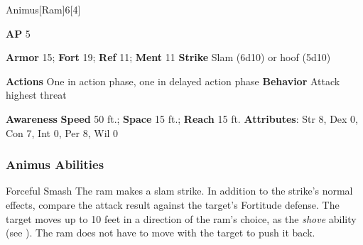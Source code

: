 \begin{monsection}{Animus}[Ram]{6}[4]
\vspace{-1em}\vspace{-1em}
\begin{spellcontent}
\begin{spelltargetinginfo}
{\textbf{AP} 5}

\pari \textbf{Armor} 15;
\textbf{Fort} 19;
\textbf{Ref} 11;
\textbf{Ment} 11
\pari \textbf{Strike} Slam  (6d10) or hoof  (5d10)


\pari \textbf{Actions} One in action phase, one in delayed action phase
\pari \textbf{Behavior} Attack highest threat
\end{spelltargetinginfo}
\end{spellcontent}

\begin{monsterfooter}
\pari \textbf{Awareness} 
\pari \textbf{Speed} 50 ft.;
\textbf{Space} 15 ft.;
\textbf{Reach} 15 ft.
\pari \textbf{Attributes}:
Str 8,
Dex 0,
Con 7,
Int 0,
Per 8,
Wil 0
\end{monsterfooter}
\end{monsection}


\subsubsection{Animus Abilities}

\begin{ability}{Forceful Smash}
The ram makes a slam strike.
In addition to the strike's normal effects, compare the attack result against the target's Fortitude defense.
\hit The target moves up to 10 feet in a direction of the ram's choice, as the \textit{shove} ability (see ).
The ram does not have to move with the target to push it back.
\end{ability}

